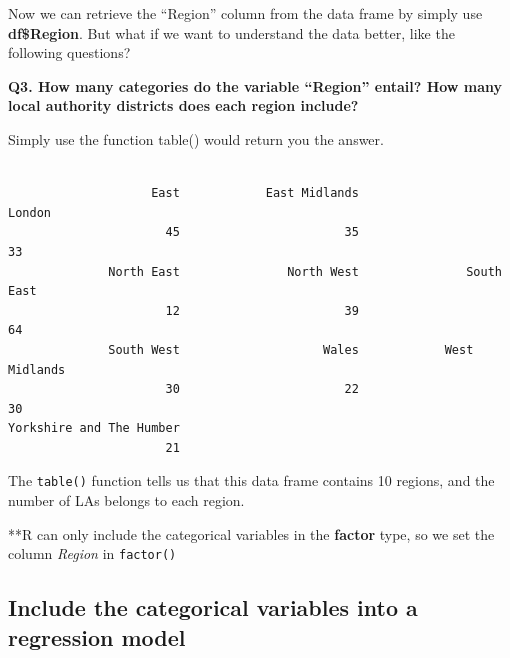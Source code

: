 \documentclass[
  letterpaper,
  DIV=11,
  numbers=noendperiod]{scrreprt}
\newenvironment{Shaded}{\begin{snugshade}}{\end{snugshade}}
\newcommand{\FunctionTok}[1]{\textcolor[rgb]{0.28,0.35,0.67}{#1}}
\newcommand{\NormalTok}[1]{\textcolor[rgb]{0.00,0.23,0.31}{#1}}
\newcommand{\OtherTok}[1]{\textcolor[rgb]{0.00,0.23,0.31}{#1}}
\newcommand{\SpecialCharTok}[1]{\textcolor[rgb]{0.37,0.37,0.37}{#1}}
\begin{document}
Now we can retrieve the ``Region'' column from the data frame by simply
use \textbf{df\$Region}. But what if we want to understand the data
better, like the following questions?

\textbf{Q3. How many categories do the variable ``Region'' entail? How
many local authority districts does each region include?}

Simply use the function table() would return you the answer.

\begin{Shaded}
\end{Shaded}

\begin{verbatim}

                    East            East Midlands                   London 
                      45                       35                       33 
              North East               North West               South East 
                      12                       39                       64 
              South West                    Wales            West Midlands 
                      30                       22                       30 
Yorkshire and The Humber 
                      21 
\end{verbatim}

The \texttt{table()} function tells us that this data frame contains 10
regions, and the number of LAs belongs to each region.

**R can only include the categorical variables in the \textbf{factor}
type, so we set the column \emph{Region} in \texttt{factor()}

\begin{Shaded}
\end{Shaded}

\subsection{\texorpdfstring{\textbf{Include the categorical variables
into a regression
model}}{Include the categorical variables into a regression model}}\label{include-the-categorical-variables-into-a-regression-model}
\end{document}

